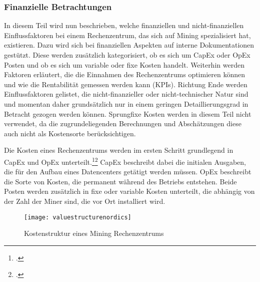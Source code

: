 \subsubsection{Finanzielle Betrachtungen} \label{toc:kennzahlenundeinflussfaktoren}

In diesem Teil wird nun beschrieben, welche finanziellen und nicht-finanziellen Einflussfaktoren bei einem
Rechenzentrum, das sich auf Mining spezialisiert hat, existieren. Dazu wird sich bei finanziellen Aspekten auf interne
Dokumentationen gestützt. Diese werden zusätzlich kategorisiert, ob es sich um \ac{CapEx} oder \ac{OpEx} Posten und
ob es sich um variable oder fixe Kosten handelt. Weiterhin werden Faktoren erläutert, die die Einnahmen des Rechenzentrums
optimieren können und wie die Rentabilität gemessen werden kann (\acp{KPI}). Richtung Ende werden Einflussfaktoren
gelistet, die nicht-finanzieller oder nicht-technischer Natur sind und momentan daher grundsätzlich nur in einem geringen
Detaillierungsgrad in Betracht gezogen werden können. Sprungfixe Kosten werden in diesem Teil nicht verwendet, da die
zugrundeliegenden Berechnungen und Abschätzungen diese auch nicht als Kostensorte berücksichtigen.


Die Kosten eines Rechenzentrums werden im ersten Schritt grundlegend in \ac{CapEx} und \ac{OpEx}
unterteilt.\footcite[Vgl.][]{appendix:capex}\footcite[Vgl.][]{appendix:opex} \ac{CapEx} beschreibt dabei die initialen
Ausgaben, die für den Aufbau eines Datencenters getätigt werden müssen. \ac{OpEx} beschreibt die Sorte von Kosten, die permanent
während des Betriebs entstehen. Beide Posten werden zusätzlich in fixe oder variable Kosten unterteilt, die abhängig
von der Zahl der Miner sind, die vor Ort installiert wird.

\begin{figure}[H]
    \caption{Kostenstruktur eines Mining Rechenzentrums}
    \texttt{[image: valuestructurenordics]}
    \label{figure:valuestructurenordics}
\end{figure}

